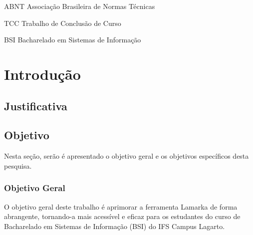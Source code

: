 \documentclass[
	12pt,				%
	oneside,			%
	a4paper,			%
	english,			%
	french,				%
	spanish,			%
	brazil				%
	]{abntex2}
\newcommand{\listasdousuario}{}
\begin{document}
\listasdousuario

\begin{siglas}
  \item[ABNT] Associação Brasileira de Normas Técnicas
  \item[TCC] Trabalho de Conclusão de Curso
  \item[BSI] Bacharelado em Sistemas de Informação
\end{siglas}

\tableofcontents*
\cleardoublepage


\textual
\pagestyle{simple}                  %


\hypertarget{introduuxe7uxe3o}{%
\chapter{Introdução}\label{introduuxe7uxe3o}}

\hypertarget{justificativa}{%
\section{Justificativa}\label{justificativa}}

\hypertarget{objetivo}{%
\section{Objetivo}\label{objetivo}}

Nesta seção, serão é apresentado o objetivo geral e os objetivos
específicos desta pesquisa.

\hypertarget{objetivo-geral}{%
\subsection{Objetivo Geral}\label{objetivo-geral}}

O objetivo geral deste trabalho é aprimorar a ferramenta Lamarka de
forma abrangente, tornando-a mais acessível e eficaz para os estudantes
do curso de Bacharelado em Sistemas de Informação (BSI) do IFS Campus
Lagarto.
\end{document}

